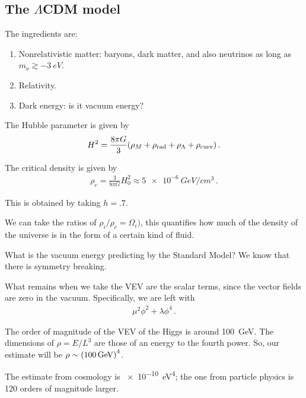 \documentclass[main.tex]{subfiles}
\begin{document}
\subsection{The \(\Lambda \)CDM model}

The ingredients are: 
\begin{enumerate}
    \item Nonrelativistic matter: baryons, dark matter, and also neutrinos as long as \(m_{\nu } \gtrsim \SI{-3}{eV}\). 
    \item Relativity.
    \item Dark energy: is it vacuum energy? 
\end{enumerate}

The Hubble parameter is given by 
%
\begin{align}
H^2 = \frac{8 \pi G}{3} \qty(\rho_{M} + \rho _{\text{rad}} + \rho_{\Lambda } + \rho _{\text{curv}})
\,.
\end{align}

The critical density is given by 
%
\begin{align}
\rho_{c} = \frac{3}{8 \pi G} H_0^2 \approx \SI{5e-6}{GeV / cm^3}
\,.
\end{align}

This is obtained by taking \(h = \num{.7}\). 

We can take the ratios of \(\rho_{i} / \rho_{c} = \Omega_{i})\), this quantifies how much of the density of the universe is in the form of a certain kind of fluid. 

What is the vacuum energy predicting by the Standard Model? 
We know that there is symmetry breaking. 

What remains when we take the VEV are the scalar terms, since the vector fields are zero in the vacuum. Specifically, we are left with 
%
\begin{align}
\mu^2 \phi^2 + \lambda \phi^{4}
\,.
\end{align}

The order of magnitude of the VEV of the Higgs is around \SI{100}{GeV}. 
The dimensions of \(\rho = E / L^3\) are those of an energy to the fourth power. So, our estimate will be \(\rho \sim \qty(\SI{100}{GeV})^{4}\). 

The estimate from cosmology is \SI{e-10}{eV^{4}}; the one from particle physics is 120 orders of magnitude larger.
\end{document}
